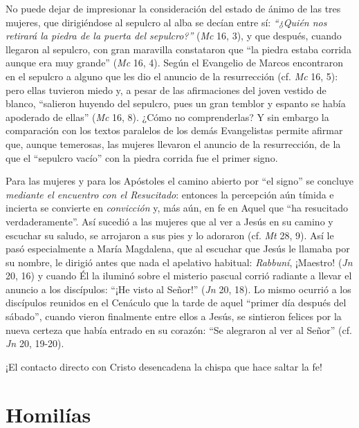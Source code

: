 			\begin{body}No puede dejar de impresionar la consideración del estado de ánimo de las tres mujeres, que dirigiéndose al sepulcro al alba se decían entre sí: \textit{“¿Quién nos retirará la piedra de la puerta del sepulcro?”} (\textit{Mc }16, 3), y que después, cuando llegaron al sepulcro, con gran maravilla constataron que “la piedra estaba corrida aunque era muy grande” (\textit{Mc} 16, 4). Según el Evangelio de Marcos encontraron en el sepulcro a alguno que les dio el anuncio de la resurrección (cf. \textit{Mc }16, 5): pero ellas tuvieron miedo y, a pesar de las afirmaciones del joven vestido de blanco, “salieron huyendo del sepulcro, pues un gran temblor y espanto se había apoderado de ellas” (\textit{Mc} 16, 8). ¿Cómo no comprenderlas? Y sin embargo la comparación con los textos paralelos de los demás Evangelistas permite afirmar que, aunque temerosas, las mujeres llevaron el anuncio de la resurrección, de la que el “sepulcro vacío” con la piedra corrida fue el primer signo.\end{body}
			
			\begin{body}Para las mujeres y para los Apóstoles el camino abierto por “el signo” se concluye \textit{mediante el encuentro con el Resucitado}: entonces la percepción aún tímida e incierta se convierte en \textit{convicción} y, más aún, en fe en Aquel que “ha resucitado verdaderamente”. Así sucedió a las mujeres que al ver a Jesús en su camino y escuchar su saludo, se arrojaron a sus pies y lo adoraron (cf. \textit{Mt }28, 9). Así le pasó especialmente a María Magdalena, que al escuchar que Jesús le llamaba por su nombre, le dirigió antes que nada el apelativo habitual: \textit{Rabbuní}, ¡Maestro! (\textit{Jn }20, 16) y cuando Él la iluminó sobre el misterio pascual corrió radiante a llevar el anuncio a los discípulos: “¡He visto al Señor!” (\textit{Jn }20, 18). Lo mismo ocurrió a los discípulos reunidos en el Cenáculo que la tarde de aquel “primer día después del sábado”, cuando vieron finalmente entre ellos a Jesús, se sintieron felices por la nueva certeza que había entrado en su corazón: “Se alegraron al ver al Señor” (cf. \textit{Jn }20, 19-20).\end{body}
			
			\begin{body}¡El contacto directo con Cristo desencadena la chispa que hace saltar la fe!\end{body}
			
			\section{Homilías}
			
